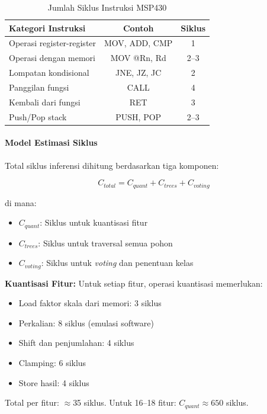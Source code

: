 \begin{table}[htbp]
\centering
\caption{Jumlah Siklus Instruksi MSP430}
\label{tab:msp430_cycles}
\begin{tabular}{lcc}
\hline
\textbf{Kategori Instruksi} & \textbf{Contoh} & \textbf{Siklus} \\
\hline
Operasi register-register & MOV, ADD, CMP & 1 \\
Operasi dengan memori & MOV @Rn, Rd & 2--3 \\
Lompatan kondisional & JNE, JZ, JC & 2 \\
Panggilan fungsi & CALL & 4 \\
Kembali dari fungsi & RET & 3 \\
Push/Pop stack & PUSH, POP & 2--3 \\
\hline
\end{tabular}
\end{table}

\paragraph{Model Estimasi Siklus}
Total siklus inferensi dihitung berdasarkan tiga komponen:

\begin{equation}
    C_{total} = C_{quant} + C_{trees} + C_{voting}
\end{equation}

di mana:
\begin{itemize}
    \item $C_{quant}$: Siklus untuk kuantisasi fitur
    \item $C_{trees}$: Siklus untuk traversal semua pohon
    \item $C_{voting}$: Siklus untuk \textit{voting} dan penentuan kelas
\end{itemize}

\textbf{Kuantisasi Fitur:}
Untuk setiap fitur, operasi kuantisasi memerlukan:
\begin{itemize}
    \item Load faktor skala dari memori: 3 siklus
    \item Perkalian: 8 siklus (emulasi software)
    \item Shift dan penjumlahan: 4 siklus
    \item Clamping: 6 siklus
    \item Store hasil: 4 siklus
\end{itemize}

Total per fitur: $\approx$35 siklus. Untuk 16--18 fitur: $C_{quant} \approx 650$ siklus.

